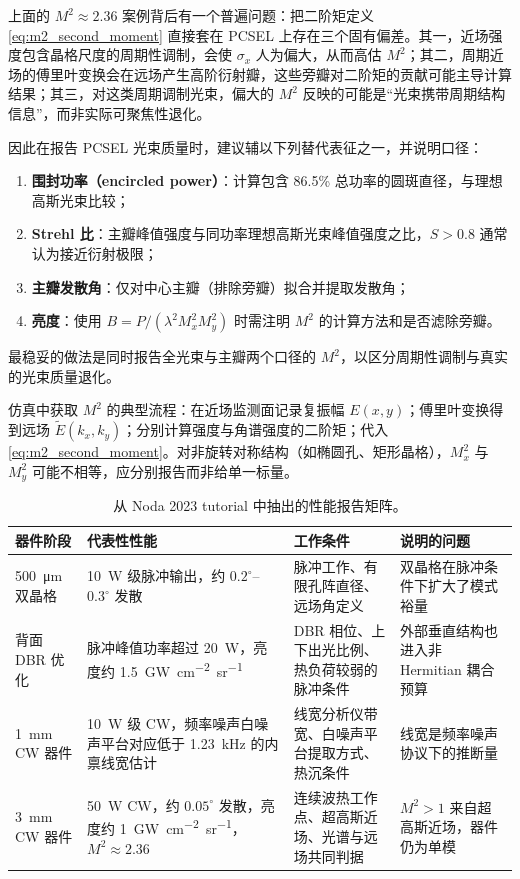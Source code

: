 \begin{WarningBox}
上面的 $M^2\approx2.36$ 案例背后有一个普遍问题：把二阶矩定义 \cref{eq:m2_second_moment} 直接套在 PCSEL 上存在三个固有偏差。其一，近场强度包含晶格尺度的周期性调制，会使 $\sigma_x$ 人为偏大，从而高估 $M^2$；其二，周期近场的傅里叶变换会在远场产生高阶衍射瓣，这些旁瓣对二阶矩的贡献可能主导计算结果；其三，对这类周期调制光束，偏大的 $M^2$ 反映的可能是“光束携带周期结构信息”，而非实际可聚焦性退化。

因此在报告 PCSEL 光束质量时，建议辅以下列替代表征之一，并说明口径：
\begin{enumerate}
  \item \textbf{围封功率（encircled power）}：计算包含 86.5\% 总功率的圆斑直径，与理想高斯光束比较；
  \item \textbf{Strehl 比}：主瓣峰值强度与同功率理想高斯光束峰值强度之比，$S>0.8$ 通常认为接近衍射极限；
  \item \textbf{主瓣发散角}：仅对中心主瓣（排除旁瓣）拟合并提取发散角；
  \item \textbf{亮度}：使用 $B=P/(\lambda^2 M_x^2 M_y^2)$ 时需注明 $M^2$ 的计算方法和是否滤除旁瓣。
\end{enumerate}
最稳妥的做法是同时报告全光束与主瓣两个口径的 $M^2$，以区分周期性调制与真实的光束质量退化。

仿真中获取 $M^2$ 的典型流程：在近场监测面记录复振幅 $E(x,y)$；傅里叶变换得到远场 $\tilde{E}(k_x,k_y)$；分别计算强度与角谱强度的二阶矩；代入 \cref{eq:m2_second_moment}。对非旋转对称结构（如椭圆孔、矩形晶格），$M_x^2$ 与 $M_y^2$ 可能不相等，应分别报告而非给单一标量。
\end{WarningBox}

\begin{table}[htbp]
  \centering
  \footnotesize
  \caption{从 Noda 2023 tutorial 中抽出的性能报告矩阵。}
  \label{tab:noda2023_metric_protocol}
  \setlength{\tabcolsep}{4pt}
  \begin{tabularx}{\textwidth}{@{}p{2.4cm}p{2.6cm}p{2.7cm}Y@{}}
    \toprule
    器件阶段 & 代表性性能 & 工作条件 & 说明的问题 \\ \midrule
    \SI{500}{\micro\meter} 双晶格 & \SI{10}{W} 级脉冲输出，约 $0.2^\circ$--$0.3^\circ$ 发散 & 脉冲工作、有限孔阵直径、远场角定义 & 双晶格在脉冲条件下扩大了模式裕量 \\
    背面 DBR 优化 & 脉冲峰值功率超过 \SI{20}{W}，亮度约 \SI{1.5}{GW.cm^{-2}.sr^{-1}} & DBR 相位、上下出光比例、热负荷较弱的脉冲条件 & 外部垂直结构也进入非 Hermitian 耦合预算 \\
    \SI{1}{mm} CW 器件 & \SI{10}{W} 级 CW，频率噪声白噪声平台对应低于 \SI{1.23}{kHz} 的内禀线宽估计 & 线宽分析仪带宽、白噪声平台提取方式、热沉条件 & 线宽是频率噪声协议下的推断量 \\
    \SI{3}{mm} CW 器件 & \SI{50}{W} CW，约 $0.05^\circ$ 发散，亮度约 \SI{1}{GW.cm^{-2}.sr^{-1}}，$M^2\approx2.36$ & 连续波热工作点、超高斯近场、光谱与远场共同判据 & $M^2>1$ 来自超高斯近场，器件仍为单模 \\
    \bottomrule
  \end{tabularx}
\end{table}

